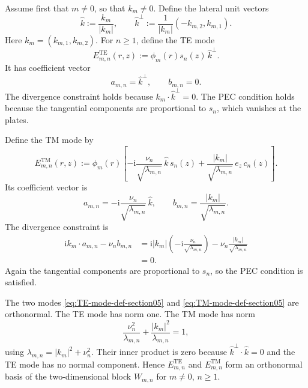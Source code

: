 \documentclass[11pt]{article}
\providecommand{\ii}{\mathrm{i}}
\providecommand{\abs}[1]{\left\lvert #1\right\rvert}
\providecommand{\lambdamn}{\lambda_{m,n}}
\providecommand{\phim}{\phi_m}
\providecommand{\sn}{s_n}
\providecommand{\cn}{c_n}
\providecommand{\khat}{\widehat{k}}
\providecommand{\khatperp}{\widehat{k}^{\perp}}
\numberwithin{equation}{section}
\begin{document}
Assume first that \(m\ne0\), so that \(k_m\ne0\).  Define the lateral unit
vectors
\begin{equation}
    \khat:=\frac{k_m}{\abs{k_m}},
    \qquad
    \khatperp:=\frac{1}{\abs{k_m}}(-k_{m,2},k_{m,1}) .
    \label{eq:khat-khatperp-def-section05}
\end{equation}
Here \(k_m=(k_{m,1},k_{m,2})\).  For \(n\geq1\), define the TE mode
\begin{equation}
    E^{\mathrm{TE}}_{m,n}(r,z)
    :=
    \phim(r)\sn(z)\,\khatperp .
    \label{eq:TE-mode-def-section05}
\end{equation}
It has coefficient vector
\begin{equation}
    a_{m,n}=\khatperp,
    \qquad
    b_{m,n}=0 .
    \label{eq:TE-coeff-section05}
\end{equation}
The divergence constraint holds because \(k_m\cdot\khatperp=0\).  The PEC
condition holds because the tangential components are proportional to \(\sn\),
which vanishes at the plates.

Define the TM mode by
\begin{equation}
    E^{\mathrm{TM}}_{m,n}(r,z)
    :=
    \phim(r)
    \left[
        -\ii\frac{\nu_n}{\sqrt{\lambdamn}}\,\khat\,\sn(z)
        +
        \frac{\abs{k_m}}{\sqrt{\lambdamn}}\, e_z\,\cn(z)
    \right] .
    \label{eq:TM-mode-def-section05}
\end{equation}
Its coefficient vector is
\begin{equation}
    a_{m,n}
    =
    -\ii\frac{\nu_n}{\sqrt{\lambdamn}}\,\khat,
    \qquad
    b_{m,n}
    =
    \frac{\abs{k_m}}{\sqrt{\lambdamn}} .
    \label{eq:TM-coeff-section05}
\end{equation}
The divergence constraint is
\begin{align*}
    \ii k_m\cdot a_{m,n}-\nu_n b_{m,n}
    &=
    \ii\abs{k_m}
    \left(-\ii\frac{\nu_n}{\sqrt{\lambdamn}}\right)
    -
    \nu_n\frac{\abs{k_m}}{\sqrt{\lambdamn}} \\
    &=0 .
\end{align*}
Again the tangential components are proportional to \(\sn\), so the PEC
condition is satisfied.

The two modes \eqref{eq:TE-mode-def-section05} and
\eqref{eq:TM-mode-def-section05} are orthonormal.  The TE mode has norm one.
The TM mode has norm
\begin{equation}
    \frac{\nu_n^2}{\lambdamn}
    +
    \frac{\abs{k_m}^2}{\lambdamn}
    =1,
    \label{eq:TM-normalization-section05}
\end{equation}
using \(\lambdamn=\abs{k_m}^2+\nu_n^2\).  Their inner product is zero because
\(\khatperp\cdot\khat=0\) and the TE mode has no normal component.  Hence
\(E^{\mathrm{TE}}_{m,n}\) and \(E^{\mathrm{TM}}_{m,n}\) form an orthonormal basis
of the two-dimensional block \(W_{m,n}\) for \(m\ne0\), \(n\geq1\).
\end{document}
